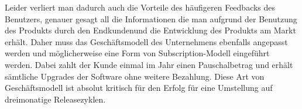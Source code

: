 Leider verliert man dadurch auch die Vorteile des häufigeren Feedbacks des Benutzers, genauer gesagt all die Informationen die man aufgrund der Benutzung des Produkts durch den Endkundenund die Entwicklung des Produkts am Markt erhält. Daher muss das
Geschäftsmodell des Unternehmens ebenfalls angepasst werden und möglicherweise
eine Form von Subscription-Modell eingeführt werden. Dabei zahlt der Kunde
einmal im Jahr einen Pauschalbetrag und erhält sämtliche Upgrades der Software
ohne weitere Bezahlung. Diese Art von Geschäftsmodell ist absolut kritisch für
den Erfolg für eine Umstellung auf dreimonatige Releasezyklen.

